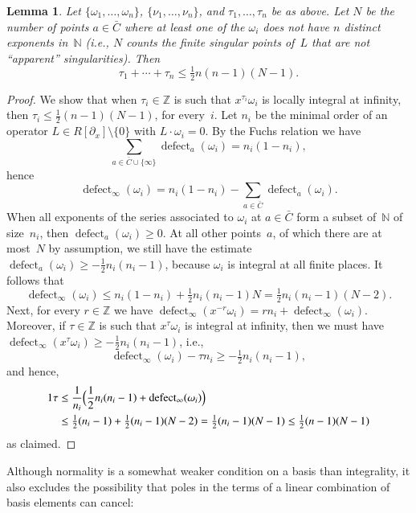 \documentclass[final,1p,times,authoryear]{elsarticle}
\newtheorem{lemma}[theorem]{Lemma}
\def\defect{\operatorname{defect}}
\let\set\mathbb
\begin{document}
\begin{lemma}\label{lemma:bound-exps}
  Let $\{\omega_1,\dots,\omega_n\}$, $\{\nu_1,\dots,\nu_n\}$, and $\tau_1,\dots,\tau_n$ be as above.
  Let $N$ be the number of points $a\in\bar C$ where at least one of the $\omega_i$ does not have
  $n$ distinct exponents in~$\set N$ (i.e., $N$ counts the
  finite singular points of~$L$ that are not ``apparent'' singularities).
  Then
  \[
    \tau_1+\cdots+\tau_n \leq \tfrac12 n(n-1)(N-1).
  \]
\end{lemma}
\begin{proof}
  We show that when $\tau_i\in\set Z$ is such that $x^{\tau_i}\omega_i$ is locally integral at infinity,
  then $\tau_i\leq \frac12 (n-1)(N-1)$, for every~$i$.
  Let $n_i$ be the minimal order of an operator $L\in R[\partial_x]\setminus\{0\}$ with $L\cdot\omega_i=0$.
  By the Fuchs relation we have
  \[
    \sum_{a\in\bar C\cup\{\infty\}}\defect_a(\omega_i) = n_i(1-n_i),
  \]
  hence
  \[
    \defect_\infty(\omega_i) = n_i(1-n_i) - \sum_{a\in\bar C}\defect_a(\omega_i).
  \]
  When all exponents of the series associated to $\omega_i$ at $a\in\bar C$ form a subset of~$\set N$ of size~$n_i$, then
  $\defect_a(\omega_i)\geq0$. At all other points~$a$, of which there are at most~$N$ by assumption,
  we still have the estimate $\defect_a(\omega_i)\geq-\frac12n_i(n_i-1)$, because $\omega_i$ is integral at all finite places.
  It follows that
  \[
    \defect_\infty(\omega_i)\leq n_i(1-n_i) + \tfrac12 n_i(n_i-1) N = \tfrac12 n_i(n_i-1)(N-2).
  \]
  Next, for every $r\in\set Z$ we have $\defect_\infty(x^{-r}\omega_i) = rn_i+\defect_\infty(\omega_i)$.
  Moreover, if $\tau\in\set Z$ is such that $x^{\tau}\omega_i$ is integral at infinity, then we must have
  $\defect_\infty(x^{\tau}\omega_i)\geq -\frac12n_i(n_i-1)$, i.e.,
  \[
    \defect_\infty(\omega_i) - \tau n_i \geq -\tfrac12n_i(n_i-1),
  \]
  and hence,
  \begin{alignat*}1
    \tau &\leq \frac1{n_i}\Bigl( \frac12n_i(n_i-1) + \defect_\infty(\omega_i) \Bigr) \\
      &\leq \tfrac12 (n_i-1) + \tfrac12 (n_i-1)(N-2) = \tfrac12 (n_i-1)(N-1) \leq \tfrac12(n-1)(N-1)
  \end{alignat*}
  as claimed.
\end{proof}

Although normality is a somewhat weaker condition on a basis than integrality,
it also excludes the possibility that poles in the terms of a linear combination
of basis elements can cancel:
\end{document}
